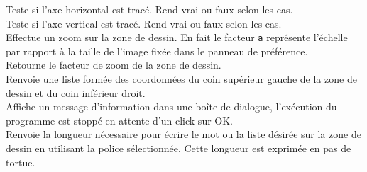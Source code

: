 Teste si l'axe horizontal est tracé. Rend vrai ou faux selon les cas.\\
Teste si l'axe vertical est tracé. Rend vrai ou faux selon les cas.\\
Effectue un zoom sur la zone de dessin. En fait le facteur \texttt{a} représente l'échelle par rapport à la taille de l'image fixée dans le panneau de préférence.\\
Retourne le facteur de zoom de la zone de dessin.\\
Renvoie une liste formée des coordonnées du coin supérieur gauche de la zone de dessin et du coin inférieur droit.\\
 Affiche un message d'information dans une boîte de dialogue, l'exécution du programme est stoppé en attente d'un click sur OK.\\
Renvoie la longueur nécessaire pour écrire le mot ou la liste désirée sur la zone de dessin en utilisant la police sélectionnée. Cette longueur est exprimée en pas de tortue. \\
